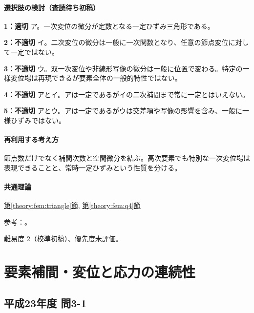 \paragraph{選択肢の検討（査読待ち初稿）}\mbox{}\par

\noindent\textbf{1：適切} ア。一次変位の微分が定数となる一定ひずみ三角形である。\par

\noindent\textbf{2：不適切} イ。二次変位の微分は一般に一次関数となり、任意の節点変位に対して一定ではない。\par

\noindent\textbf{3：不適切} ウ。双一次変位や非線形写像の微分は一般に位置で変わる。特定の一様変位場は再現できるが要素全体の一般的特性ではない。\par

\noindent\textbf{4：不適切} アとイ。アは一定であるがイの二次補間まで常に一定とはいえない。\par

\noindent\textbf{5：不適切} アとウ。アは一定であるがウは交差項や写像の影響を含み、一般に一様ひずみではない。\par

\paragraph{再利用する考え方} 節点数だけでなく補間次数と空間微分を結ぶ。高次要素でも特別な一次変位場は表現できることと、常時一定ひずみという性質を分ける。

\paragraph{共通理論} \hyperref[theory:fem:triangle]{第\ref*{theory:fem:triangle}節}, \hyperref[theory:fem:q4]{第\ref*{theory:fem:q4}節}

\par 参考：\cite{mit_roy_fea1999}。

\par 難易度 2（校準初稿）、優先度未評価。

\section{要素補間・変位と応力の連続性}

\subsection{平成23年度 問3-1}
\label{q:h23-reg-basic-3-1}

